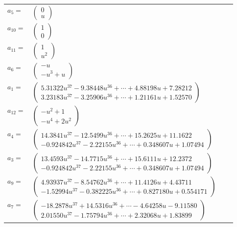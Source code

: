 \documentclass[1p]{elsarticle_modified}
\theoremstyle{definition}
\begin{document}
\begin{tabular}{m{7pt} m{180pt} m{7pt} m{180pt} }
\flushright $a_{5}=$&$\begin{pmatrix}0\\u\end{pmatrix}$ \\
\flushright $a_{10}=$&$\begin{pmatrix}1\\0\end{pmatrix}$ \\
\flushright $a_{11}=$&$\begin{pmatrix}1\\u^2\end{pmatrix}$ \\
\flushright $a_{6}=$&$\begin{pmatrix}- u\\- u^3+u\end{pmatrix}$ \\
\flushright $a_{1}=$&$\begin{pmatrix}5.31322 u^{37}-9.38448 u^{36}+\cdots+4.88198 u+7.28212\\3.23183 u^{37}-3.25906 u^{36}+\cdots+1.21161 u+1.52570\end{pmatrix}$ \\
\flushright $a_{12}=$&$\begin{pmatrix}- u^2+1\\- u^4+2 u^2\end{pmatrix}$ \\
\flushright $a_{4}=$&$\begin{pmatrix}14.3841 u^{37}-12.5499 u^{36}+\cdots+15.2625 u+11.1622\\-0.924842 u^{37}-2.22155 u^{36}+\cdots+0.348607 u+1.07494\end{pmatrix}$ \\
\flushright $a_{3}=$&$\begin{pmatrix}13.4593 u^{37}-14.7715 u^{36}+\cdots+15.6111 u+12.2372\\-0.924842 u^{37}-2.22155 u^{36}+\cdots+0.348607 u+1.07494\end{pmatrix}$ \\
\flushright $a_{9}=$&$\begin{pmatrix}4.93937 u^{37}-8.54762 u^{36}+\cdots+11.4126 u+4.43711\\-1.52994 u^{37}-0.382225 u^{36}+\cdots+0.827180 u+0.554171\end{pmatrix}$ \\
\flushright $a_{7}=$&$\begin{pmatrix}-18.2878 u^{37}+14.5316 u^{36}+\cdots-4.64258 u-9.11580\\2.01550 u^{37}-1.75794 u^{36}+\cdots+2.32068 u+1.83899\end{pmatrix}$ \\

\end{tabular}
\end{document}

